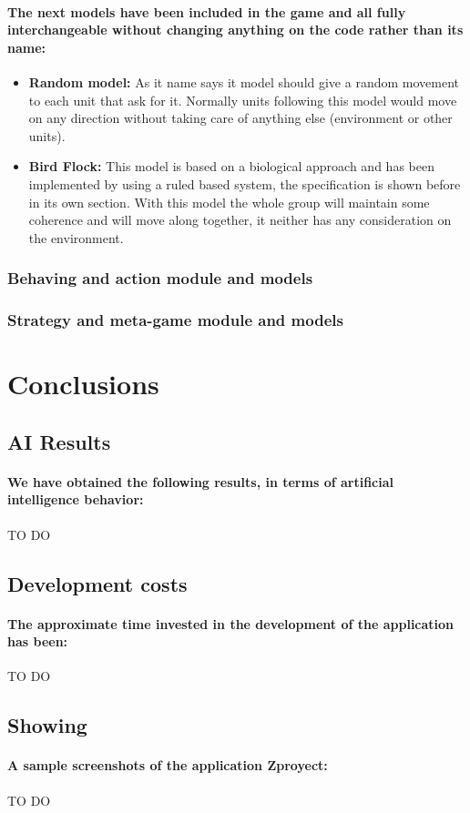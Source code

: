 \documentclass[a4paper,10pt]{article}
\newcommand{\p}[1]{\paragraph{\indent\textnormal{#1}}}
\begin{document}
    \p{The next models have been included in the game and all fully interchangeable without changing anything on the code rather than its name:}

    \begin{itemize}
     \item \textbf{Random model:} As it name says it model should give a random movement to each unit that ask for it. Normally units following this model would move on any direction without taking care of anything else (environment or other units).
     \item \textbf{Bird Flock:} This model is based on a biological approach and has been implemented by using a ruled based system, the specification is shown before in its own section. With this model the whole group will maintain some coherence and will move along together, it neither has any consideration on the environment.
    \end{itemize}


  \subsubsection{Behaving and action module and models}

  \subsubsection{Strategy and meta-game module and models}


\section{Conclusions}

  \subsection{AI Results}
    \p{We have obtained the following results, in terms of artificial intelligence behavior:}
    TO DO

  \subsection{Development costs}
    \p{The approximate time invested in the development of the application has been:}
    TO DO

  \subsection{Showing}
    \p{A sample screenshots of the application Zproyect:}
    TO DO
\end{document}
